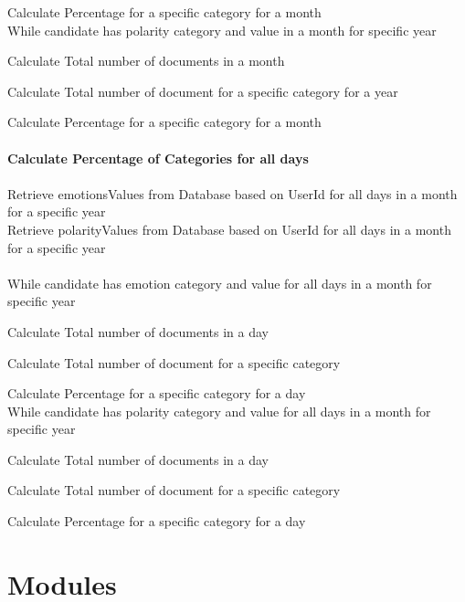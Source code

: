\documentclass[oneside,a4paper,12pt]{pictreport}
\begin{document}
	\par Calculate Percentage for a specific category for a month\\
While candidate has polarity category and value in a month for specific year
	\par Calculate Total number of documents in a month
	\par Calculate Total number of document for a specific category for a year
	\par Calculate Percentage for a specific category for a month\\\\
\textbf{Calculate Percentage of Categories for all days}\\\\
Retrieve emotionsValues from Database based on UserId for all days in a month for a specific year\\
Retrieve polarityValues from Database based on UserId for all days in a month for a specific year\\\\
While candidate has emotion category and value for all days in a month for specific year
	\par Calculate Total number of documents in a day
	\par Calculate Total number of document for a specific category
	\par Calculate Percentage for a specific category for a day\\
While candidate has polarity category and value for all days in a month for specific year
	\par Calculate Total number of documents in a day
	\par Calculate Total number of document for a specific category
	\par Calculate Percentage for a specific category for a day
\section{Modules}
\end{document}

